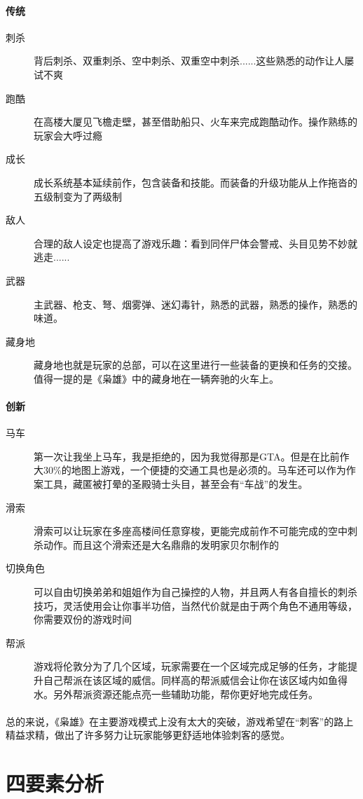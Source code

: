 \documentclass{article} \usepackage{CJK}
\begin{document}
\paragraph{传统}
\begin{description}
  \item[刺杀] 背后刺杀、双重刺杀、空中刺杀、双重空中刺杀......这些熟悉的动作让人屡试不爽
  \item[跑酷] 在高楼大厦见飞檐走壁，甚至借助船只、火车来完成跑酷动作。操作熟练的玩家会大呼过瘾
  \item[成长] 成长系统基本延续前作，包含装备和技能。而装备的升级功能从上作拖沓的五级制变为了两级制
  \item[敌人] 合理的敌人设定也提高了游戏乐趣：看到同伴尸体会警戒、头目见势不妙就逃走......
  \item[武器] 主武器、枪支、弩、烟雾弹、迷幻毒针，熟悉的武器，熟悉的操作，熟悉的味道。
  \item[藏身地] 藏身地也就是玩家的总部，可以在这里进行一些装备的更换和任务的交接。值得一提的是《枭雄》中的藏身地在一辆奔驰的火车上。
\end{description}
\paragraph{创新}
\begin{description}
  \item[马车] 第一次让我坐上马车，我是拒绝的，因为我觉得那是GTA。但是在比前作大30\%的地图上游戏，一个便捷的交通工具也是必须的。马车还可以作为作案工具，藏匿被打晕的圣殿骑士头目，甚至会有“车战”的发生。
  \item[滑索] 滑索可以让玩家在多座高楼间任意穿梭，更能完成前作不可能完成的空中刺杀动作。而且这个滑索还是大名鼎鼎的发明家贝尔制作的
  \item[切换角色] 可以自由切换弟弟和姐姐作为自己操控的人物，并且两人有各自擅长的刺杀技巧，灵活使用会让你事半功倍，当然代价就是由于两个角色不通用等级，你需要双份的游戏时间
  \item[帮派] 游戏将伦敦分为了几个区域，玩家需要在一个区域完成足够的任务，才能提升自己帮派在该区域的威信。同样高的帮派威信会让你在该区域内如鱼得水。另外帮派资源还能点亮一些辅助功能，帮你更好地完成任务。
\end{description}
\paragraph{}
总的来说，《枭雄》在主要游戏模式上没有太大的突破，游戏希望在“刺客”的路上精益求精，做出了许多努力让玩家能够更舒适地体验刺客的感觉。
\section{四要素分析}
\end{document}
